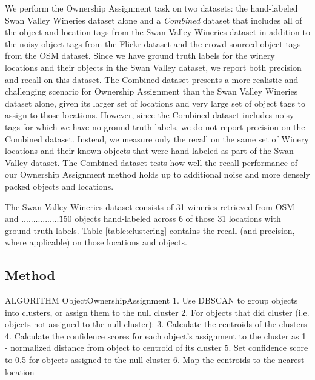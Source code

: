 We perform the Ownership Assignment task on two datasets: the hand-labeled Swan Valley Wineries dataset alone and a \textit{Combined} dataset that includes all of the object and location tags from the Swan Valley Wineries dataset in addition to the noisy object tags from the Flickr dataset and the crowd-sourced object tags from the OSM dataset.
Since we have ground truth labels for the winery locations and their objects in the Swan Valley dataset, we report both precision and recall on this dataset.
The Combined dataset presents a more realistic and challenging scenario for Ownership Assignment than the Swan Valley Wineries dataset alone, given its larger set of locations and very large set of object tags to assign to those locations. However, since the Combined dataset includes noisy tags for which we have no ground truth labels, we do not report precision on the Combined dataset. Instead, we measure only the recall on the same set of Winery locations and their known objects that were hand-labeled as part of the Swan Valley dataset. The Combined dataset tests how well the recall performance of our Ownership Assignment method holds up to additional noise and more densely packed objects and locations.

The Swan Valley Wineries dataset consists of 31 wineries retrieved from OSM and ................\~150 objects hand-labeled across 6 of those 31 locations with ground-truth labels. Table \ref{table:clustering} contains the recall (and precision, where applicable) on those locations and objects.


\subsection{Method}
ALGORITHM ObjectOwnershipAssignment
1. Use DBSCAN to group objects into clusters, or assign them to the null cluster
2. For objects that did cluster (i.e. objects not assigned to the null cluster):
    3. Calculate the centroids of the clusters
    4. Calculate the confidence scores for each object's assignment to the cluster as 1 - normalized distance from object to centroid of its cluster
5. Set confidence score to 0.5 for objects assigned to the null cluster 
6. Map the centroids to the nearest location

